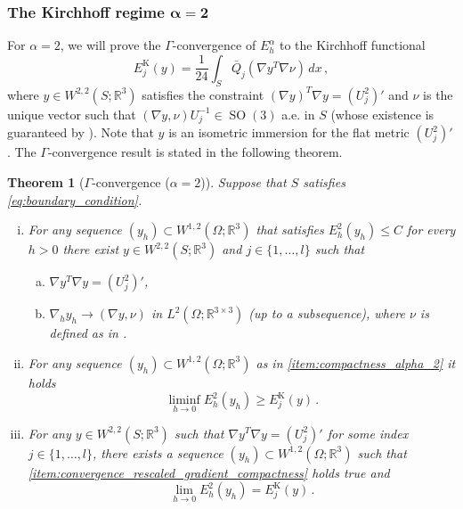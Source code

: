 \documentclass{article}
\theoremstyle{plain}
\newtheorem{teo}{Theorem}[section]
\theoremstyle{plain}
\theoremstyle{plain}
\theoremstyle{plain}
\theoremstyle{plain}
\theoremstyle{definition}
\theoremstyle{definition}
\renewcommand{\r}{\mathbb{R}}
\DeclareMathOperator{\SO}{SO}
\DeclareMathOperator{\KL}{K}
\begin{document}
\subsubsection{The Kirchhoff regime \texorpdfstring{$\bm{\alpha = 2}$}{ = 2}}

For $\alpha = 2$, we will prove the $\Gamma$-convergence of $E_h^\alpha$ to the Kirchhoff functional
\begin{equation}\label{eq:kirchoff_love}
    E^{\KL}_j(y) = \dfrac{1}{24}\displaystyle\int_S \bar Q_j(\nabla y^T \nabla \nu) \, dx \,,
\end{equation}
where $y \in W^{2,2}(S; \r^3)$ satisfies the constraint $(\nabla y)^T \nabla y = (U_j^2)'$ and $\nu$ is the unique vector such that $(\nabla y, \nu)U_j^{-1} \in \SO(3)$ a.e. in $S$ (whose existence is guaranteed by ). Note that $y$ is an isometric immersion for the flat metric $(U^2_j)'$. The $\Gamma$-convergence result is stated in the following theorem.

\begin{teo}[$\Gamma$-convergence ($\alpha = 2$)]\label{teo:gamma_convergence_alpha_2}
    Suppose that $S$ satisfies \eqref{eq:boundary_condition}. 
    \begin{enumerate}[(i)]
    	\item For any sequence $(y_h) \subset W^{1,2}(\Omega; \r^3)$ that satisfies $E_h^2(y_h) \leq C$ for every $ h > 0 $ there exist $y \in W^{2,2}(S; \r^3)$ and $j \in \{1, \dots, l\}$ such that
    	\begin{enumerate}[(a)]
    		\item $\nabla y^T \nabla y = (U_j^2)'$, \label{item:isometry_condition}
    		\item $\nabla_h y_h \to (\nabla y, \nu)$ in $L^2(\Omega; \r^{3 \times 3})$ (up to a subsequence), where $\nu$ is defined as in . \label{item:convergence_rescaled_gradient_compactness}
    	\end{enumerate} 
  		\label{item:compactness_alpha_2}
    	\item For any sequence $(y_h) \subset W^{1,2}(\Omega; \r^3)$ as in \ref{item:compactness_alpha_2} it holds
    	\[
    		\liminf\limits_{h \to 0} E_h^2(y_h) \geq E^{\KL}_j(y)\,.
    	\]\label{item:liminf_inequality_alpha_2}
    	\item For any $y \in W^{2,2}(S; \r^3)$ such that $\nabla y^T \nabla y = (U_j^2)'$ for some index $j \in \{1, \dots, l\}$, there exists a sequence $(y_h) \subset W^{1,2}(\Omega; \r^3)$ such that \ref{item:convergence_rescaled_gradient_compactness} holds true and
    	\[
    	\lim_{h \to 0} E_h^2(y_h) = E^{\KL}_j(y) \,.
    	\]\label{item:recovery sequence_alpha_2}
    \end{enumerate}
\end{teo}
\end{document}
